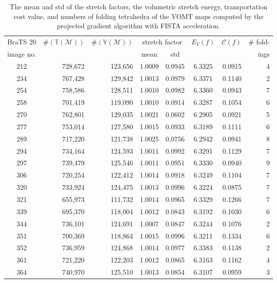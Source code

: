 \documentclass[onefignum,onetabnum]{siamonline220329}
\numberwithin{equation}{section}
\begin{document}
\begin{sloppypar}
\begin{table}
\caption{The mean and std of the stretch factors, the volumetric stretch energy, transportation cost value, and numbers of folding tetrahedra of the VOMT maps computed by the projected gradient algorithm with FISTA acceleration.}
\label{tab:FISTA}
\centering
\begin{tabular}{crrcccrr}
\hline
BraTS 20& \multirow{2}{*}{$\#(\mathbb{T}(\mathcal{M}))$} & \multirow{2}{*}{$\#(\mathbb{V}(\mathcal{M}))$} &  \multicolumn{2}{c}{stretch factor}  & \multirow{2}{*}{$E_V(f)$} & \multirow{2}{*}{$\mathcal{C}(f)$} & \# fold- \\
image no. &    &         & mean   & std    &        &        & ings \\ \hline
212 & 728,672 & 123,656 & 1.0009 & 0.0945 & 6.3325 & 0.0915 & 4 \\ 
234 & 767,428 & 129,842 & 1.0013 & 0.0979 & 6.3371 & 0.1140 & 2 \\ 
254 & 758,586 & 128,511 & 1.0010 & 0.0982 & 6.3360 & 0.0943 & 7 \\ 
258 & 701,419 & 119,090 & 1.0010 & 0.0914 & 6.3287 & 0.1054 & 6 \\ 
270 & 762,801 & 129,035 & 1.0021 & 0.0602 & 6.2905 & 0.0921 & 5 \\ 
277 & 753,014 & 127,580 & 1.0015 & 0.0933 & 6.3189 & 0.1111 & 6 \\ 
289 & 717,220 & 121,738 & 1.0025 & 0.0756 & 6.2942 & 0.0941 & 8 \\ 
294 & 734,164 & 124,593 & 1.0011 & 0.0992 & 6.3291 & 0.1129 & 7 \\ 
297 & 739,479 & 125,546 & 1.0011 & 0.0951 & 6.3330 & 0.0940 & 9 \\ 
306 & 720,254 & 122,412 & 1.0014 & 0.0918 & 6.3249 & 0.1104 & 7 \\ 
320 & 733,924 & 124,475 & 1.0013 & 0.0996 & 6.3224 & 0.0875 & 7 \\ 
321 & 655,973 & 111,732 & 1.0014 & 0.0965 & 6.3329 & 0.1266 & 7 \\ 
339 & 695,370 & 118,004 & 1.0012 & 0.0843 & 6.3192 & 0.1030 & 6 \\ 
344 & 736,101 & 124,691 & 1.0007 & 0.0847 & 6.3244 & 0.1076 & 2 \\ 
351 & 700,369 & 118,864 & 1.0015 & 0.0996 & 6.3211 & 0.1334 & 6 \\ 
352 & 736,959 & 124,868 & 1.0014 & 0.0977 & 6.3383 & 0.1138 & 2 \\ 
361 & 721,220 & 122,203 & 1.0012 & 0.0865 & 6.3163 & 0.1162 & 4 \\ 
364 & 740,970 & 125,510 & 1.0013 & 0.0854 & 6.3107 & 0.0959 & 3 \\ \hline
\end{tabular}
\end{table}


\end{sloppypar}
\end{document}
